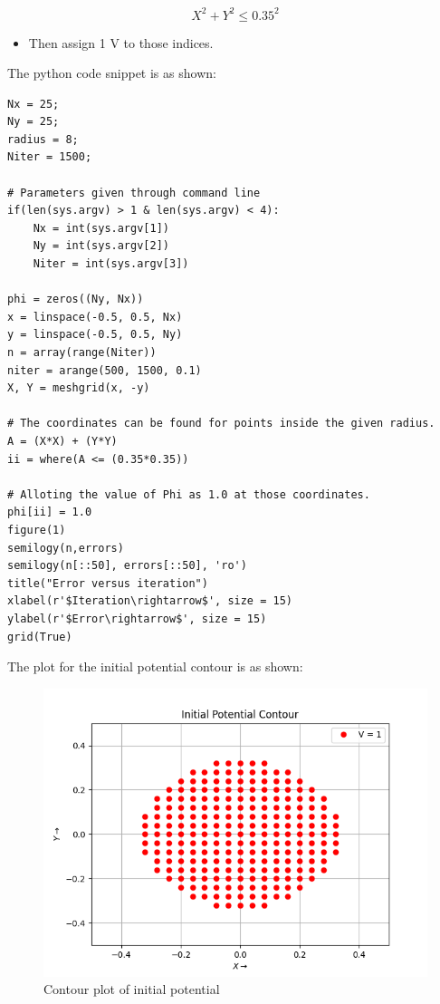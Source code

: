 \documentclass[11pt, a4paper]{article}
\begin{document}
\begin{equation}
X ^2 +Y ^2 \leq	 0.35^2
\end{equation}

\begin{itemize}
\item
  Then assign 1 V to those indices.

\end{itemize}

The python code snippet is as shown:
\begin{verbatim}
Nx = 25; 
Ny = 25; 
radius = 8;	
Niter = 1500;  

# Parameters given through command line
if(len(sys.argv) > 1 & len(sys.argv) < 4):
	Nx = int(sys.argv[1])
	Ny = int(sys.argv[2])
	Niter = int(sys.argv[3])
   
phi = zeros((Ny, Nx)) 
x = linspace(-0.5, 0.5, Nx) 
y = linspace(-0.5, 0.5, Ny)
n = array(range(Niter))
niter = arange(500, 1500, 0.1) 
X, Y = meshgrid(x, -y) 

# The coordinates can be found for points inside the given radius.
A = (X*X) + (Y*Y)
ii = where(A <= (0.35*0.35))

# Alloting the value of Phi as 1.0 at those coordinates.
phi[ii] = 1.0
figure(1)
semilogy(n,errors)
semilogy(n[::50], errors[::50], 'ro')
title("Error versus iteration")
xlabel(r'$Iteration\rightarrow$', size = 15)
ylabel(r'$Error\rightarrow$', size = 15)
grid(True)
       \end{verbatim}
       
The plot for the initial potential contour is as shown:
	     \begin{figure}[!tbh]
        \centering
        \includegraphics[scale=0.8]{Ass5_Figure_0.png}  
        \caption{Contour plot of initial potential}
   \end{figure}
 	\newpage
\end{document}
